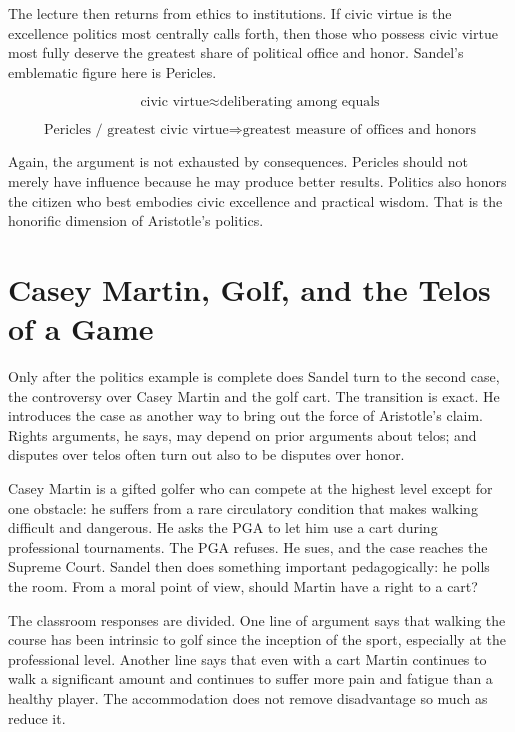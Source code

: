 The lecture then returns from ethics to institutions. If civic virtue is the excellence politics most centrally calls forth, then those who possess civic virtue most fully deserve the greatest share of political office and honor. Sandel's emblematic figure here is Pericles.

\begin{equation}
\text{civic virtue}
\approx
\text{deliberating among equals}
\end{equation}

\begin{equation}
\text{Pericles / greatest civic virtue}
\Longrightarrow
\text{greatest measure of offices and honors}
\end{equation}

Again, the argument is not exhausted by consequences. Pericles should not merely have influence because he may produce better results. Politics also honors the citizen who best embodies civic excellence and practical wisdom. That is the honorific dimension of Aristotle's politics.

\section{Casey Martin, Golf, and the Telos of a Game}

Only after the politics example is complete does Sandel turn to the second case, the controversy over Casey Martin and the golf cart. The transition is exact. He introduces the case as another way to bring out the force of Aristotle's claim. Rights arguments, he says, may depend on prior arguments about telos; and disputes over telos often turn out also to be disputes over honor.

Casey Martin is a gifted golfer who can compete at the highest level except for one obstacle: he suffers from a rare circulatory condition that makes walking difficult and dangerous. He asks the PGA to let him use a cart during professional tournaments. The PGA refuses. He sues, and the case reaches the Supreme Court. Sandel then does something important pedagogically: he polls the room. From a moral point of view, should Martin have a right to a cart?

The classroom responses are divided. One line of argument says that walking the course has been intrinsic to golf since the inception of the sport, especially at the professional level. Another line says that even with a cart Martin continues to walk a significant amount and continues to suffer more pain and fatigue than a healthy player. The accommodation does not remove disadvantage so much as reduce it.

